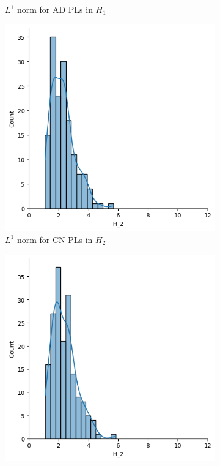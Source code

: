 \documentclass{article}
\begin{document}
\begin{figure}[htb]
\begin{subfigure}{0.32\textwidth}
    \caption{$L^1$ norm for AD PLs in $H_1$}
  \end{subfigure}
  \begin{subfigure}{0.32\textwidth}
    \includegraphics[width=\textwidth]{figures/median_pls/median_pl_CN_H_2_displot.png}
    \caption{$L^1$ norm for CN PLs in $H_2$}
  \end{subfigure}
  \begin{subfigure}{0.32\textwidth}
    \includegraphics[width=\textwidth]{figures/median_pls/median_pl_MCI_H_2_displot.png}

\end{subfigure}
\end{figure}
\end{document}
